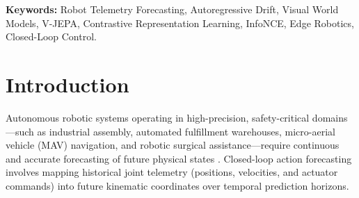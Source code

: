 \documentclass[11pt,a4paper]{article}
\begin{document}
\textbf{Keywords:} Robot Telemetry Forecasting, Autoregressive Drift, Visual World Models, V-JEPA, Contrastive Representation Learning, InfoNCE, Edge Robotics, Closed-Loop Control.

\newpage
\tableofcontents
\newpage

\section{Introduction}
\label{sec:introduction}

Autonomous robotic systems operating in high-precision, safety-critical domains—such as industrial assembly, automated fulfillment warehouses, micro-aerial vehicle (MAV) navigation, and robotic surgical assistance—require continuous and accurate forecasting of future physical states \cite{levine2016end, thrun2005probabilistic, chi2023diffusion, florence2022implicit}. Closed-loop action forecasting involves mapping historical joint telemetry (positions, velocities, and actuator commands) into future kinematic coordinates over temporal prediction horizons.
\end{document}

